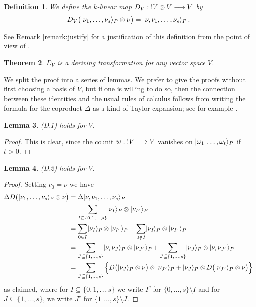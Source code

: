 \documentclass[english,letter paper,12pt,reqno]{article}
\DeclarePairedDelimiter\ket{\lvert}{\rangle}
\newtheorem{theorem}{Theorem}[section]
\newtheorem{lemma}[theorem]{Lemma}
\theoremstyle{example}
\newtheorem{definition}[theorem]{Definition}
\def\be{\begin{equation}}
\def\ee{\end{equation}}
\begin{document}
\begin{definition}\label{defn:D} We define the $k$-linear map $D_V: {!} V \otimes V \longrightarrow V$ by
\be\label{defn:DV}
D_V\big( \ket{\nu_1,\ldots,\nu_s}_P \otimes \nu \big) = \ket{ \nu, \nu_1,\ldots,\nu_s }_P\,.
\ee
\end{definition}

See Remark \ref{remark:justify} for a justification of this definition from the point of view of \cite{murfet_coalg}.

\begin{theorem}\label{main_theorem} $D_V$ is a deriving transformation for any vector space $V$.
\end{theorem}

We split the proof into a series of lemmas. We prefer to give the proofs without first choosing a basis of $V$, but if one is willing to do so, then the connection between these identities and the usual rules of calculus follows from writing the formula for the coproduct $\Delta$ as a kind of Taylor expansion; see for example \cite[(B.65)]{seiler}.

\begin{lemma} (D.1) holds for $V$.
\end{lemma}
\begin{proof}
This is clear, since the counit $w: {!} V \longrightarrow V$ vanishes on $\ket{\omega_1,\ldots,\omega_t}_P$ if $t > 0$.
\end{proof}

\begin{lemma} (D.2) holds for $V$.
\end{lemma}
\begin{proof}
Setting $\nu_0 = \nu$ we have
\begin{align*}
\Delta D \big( \ket{\nu_1,\ldots,\nu_s}_P \otimes \nu \big) &= \Delta \ket{\nu, \nu_1, \ldots, \nu_s }_P\\
&= \sum_{I \subseteq \{0,1,\ldots,s\}} \ket{\nu_I}_P \otimes \ket{\nu_{I^c}}_P\\
&= \sum_{0 \in I} \ket{\nu_I}_P \otimes \ket{\nu_{I^c}}_P + \sum_{0 \notin I} \ket{\nu_I}_P \otimes \ket{\nu_{I^c}}_P \\
&= \sum_{J \subseteq \{1,\ldots,s\}}\ket{\nu, \nu_J}_P \otimes \ket{\nu_{J^c}}_P + \sum_{J \subseteq \{1,\ldots,s\}} \ket{\nu_J}_P \otimes \ket{\nu, \nu_{J^c}}_P \\
&= \sum_{J \subseteq \{1,\ldots,s\}} \Big\{ D\big( \ket{\nu_J}_P \otimes \nu \big) \otimes \ket{\nu_{J^c}}_P + \ket{\nu_J}_P \otimes D\big( \ket{\nu_{J^c}}_P \otimes \nu \big) \Big\}
\end{align*}
as claimed, where for $I \subseteq \{0,1,\ldots,s\}$ we write $I^c$ for $\{0,\ldots,s\} \setminus I$ and for $J \subseteq \{1,\ldots,s\}$, we write $J^c$ for $\{1,\ldots,s\} \setminus J$.
\end{proof}
\end{document}
